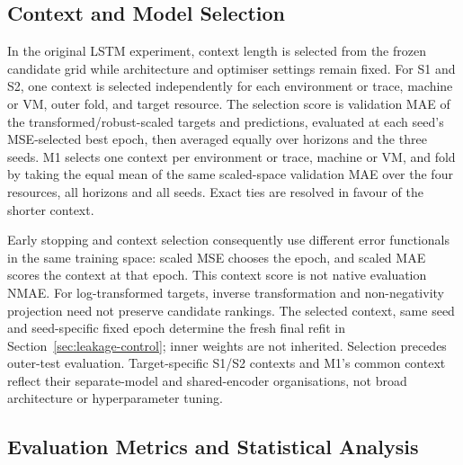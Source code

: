 \documentclass[a4paper,fleqn]{cas-dc}
\begin{document}
\subsection{Context and Model Selection}
\label{sec:model-selection}

In the original LSTM experiment, context length is selected from the frozen
candidate grid while architecture and optimiser settings remain fixed.
For S1 and S2, one context
is selected independently for each environment or trace, machine or VM, outer
fold, and target resource. The selection score is validation MAE of the
transformed/robust-scaled targets and predictions, evaluated at each seed's
MSE-selected best epoch, then averaged equally over horizons and the three
seeds. M1 selects one context per environment or trace, machine or VM, and
fold by taking the equal mean of the same scaled-space validation MAE over
the four resources, all horizons and all seeds. Exact ties are resolved
in favour of the shorter context.

Early stopping and context selection consequently use different error
functionals in the same training space: scaled MSE chooses the epoch, and
scaled MAE scores the context at that epoch. This context score is not native
evaluation NMAE. For log-transformed targets, inverse transformation and
non-negativity projection need not preserve candidate rankings.
The selected context, same seed and seed-specific fixed epoch determine the
fresh final refit in Section~\ref{sec:leakage-control}; inner weights are not
inherited. Selection precedes outer-test evaluation. Target-specific S1/S2
contexts and M1's common context reflect their separate-model and shared-encoder
organisations, not broad architecture or hyperparameter tuning.

\subsection{Evaluation Metrics and Statistical Analysis}
\label{sec:evaluation}
\end{document}
